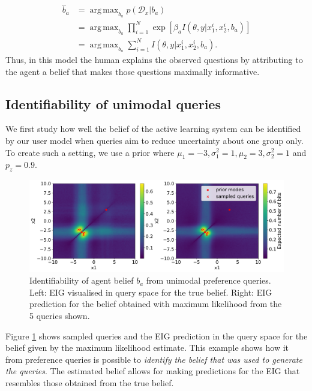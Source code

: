 \documentclass[letterpaper]{article} %
\DeclareMathOperator*{\argmax}{arg\,max}
\begin{document}

\begin{align}
    \hat{b}_a &= \argmax_{b_a}p(\mathcal{D}_x | b_a) \\
    &=\argmax_{b_a}\prod_{i=1}^N\exp\left[\beta_a I(\theta, y | x^i_1, x^i_2, b_a)\right] \\
    &=\argmax_{b_a}\sum_{i=1}^NI(\theta, y | x^i_1, x^i_2, b_a).
\end{align}
Thus, in this model the human explains the observed questions by attributing to the agent a belief that makes those questions maximally informative.

\subsection{Identifiability of unimodal queries}

We first study how well the belief of the active learning system can be identified by our user model when queries aim to reduce uncertainty about one group only. To create such a setting, we use a prior where $\mu_1=-3, \sigma_1^2=1, \mu_2 = 3, \sigma_2^2=1$ and $p_z=0.9$.

\begin{figure}[t]
\centering
\includegraphics[width=1.0\columnwidth]{unimodal_mle_3.pdf}
\caption{Identifiability of agent belief $b_a$ from unimodal preference queries. Left: EIG visualised in query space for the true belief. Right: EIG prediction for the belief obtained with maximum likelihood from the 5 queries shown.}
\label{fig:unimodal_eig}
\end{figure}

Figure \ref{fig:unimodal_eig} shows sampled queries and the EIG prediction in the query space for the belief given by the maximum likelihood estimate. This example shows how it from preference queries is possible to \textit{identify the belief that was used to generate the queries}. The estimated belief allows for making predictions for the EIG that resembles those obtained from the true belief.
\end{document}

